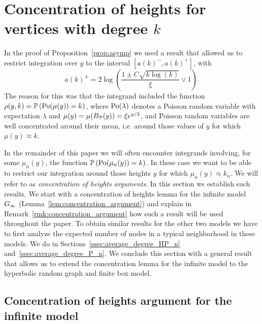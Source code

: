 \section{Concentration of heights for vertices with degree $k$}\label{sec:concentration_argument}

In the proof of Proposition~\ref{prop:asymp} we used a result that allowed us to restrict integration over $y$ to the interval $[a(k)^-, a(k)^+]$, with
\[
	a(k)^\pm = 2\log\left(\frac{1 \pm C \sqrt{k \log(k)}}{\xi} \vee 1\right).
\]
The reason for this was that the integrand included the function $\rho(y,k) = \mathbb{P}\left({\mathrm{Po}}(\mu(y)) = k\right)$, where ${\mathrm{Po}}(\lambda)$ denotes a Poisson random variable with expectation $\lambda$ and $\mu(y) = \mu(B_{{\mathcal P}}(y)) = \xi e^{y/2}$, and Poisson random variables are well concentrated around their mean, i.e. around those values of $y$ for which $\mu(y) \approx k$.

In the remainder of this paper we will often encounter integrands involving, for some $\mu_n(y)$, the function $\mathbb{P}\left({\mathrm{Po}}(\mu_n(y)) = k\right)$. In these case we want to be able to restrict our integration around those heights $y$ for which $\mu_n(y) \approx k_n$. We will refer to as \emph{concentration of heights arguments}. In this section we establish such results. We start with a concentration of heights lemma for the infinite model $G_{\infty}$ (Lemma~\ref{lem:concentration_argument}) and explain in Remark~\ref{rmk:concentration_argument} how such a result will be used throughout the paper. To obtain similar results for the other two models we have to first analyze the expected number of nodes in a typical neighborhood in these models. We do in Sections~\ref{ssec:average_degree_HP_n} and~\ref{ssec:average_degree_P_n}. We conclude this section with a general result that allows us to extend the concentration lemma for the infinite model to the hyperbolic random graph and finite box model.

\subsection{Concentration of heights argument for the infinite model}

